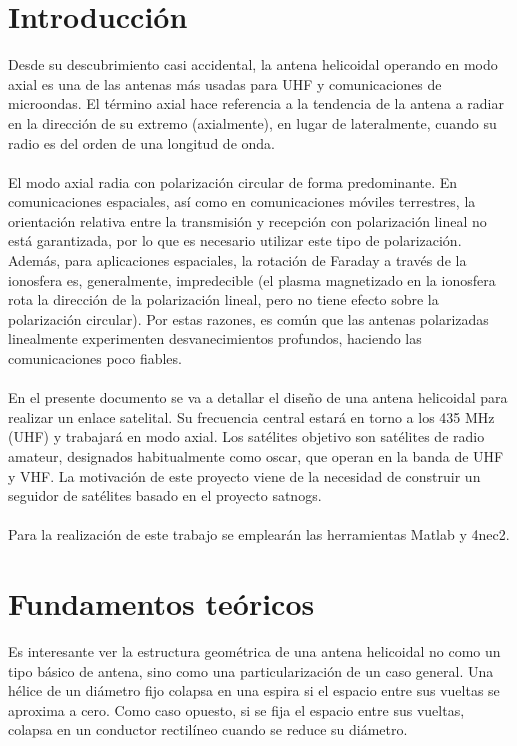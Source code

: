 \documentclass[12pt]{article}
\begin{document}
\tableofcontents
\pagebreak


\section{Introducción}
Desde su descubrimiento casi accidental, la antena helicoidal operando en modo axial es una de las antenas más usadas para UHF y comunicaciones de microondas. El término axial hace referencia a la tendencia de la antena a radiar en la dirección de su extremo (axialmente), en lugar de lateralmente, cuando su radio es del orden de una longitud de onda.\\\\
El modo axial radia con polarización circular de forma predominante. En comunicaciones espaciales, así como en comunicaciones móviles terrestres, la orientación relativa entre la transmisión y recepción con polarización lineal no está garantizada, por lo que es necesario utilizar este tipo de polarización. Además, para aplicaciones espaciales, la rotación de Faraday a través de la ionosfera es, generalmente, impredecible (el plasma magnetizado en la ionosfera rota la dirección de la polarización lineal, pero no tiene efecto sobre la polarización circular). Por estas razones, es común que las antenas polarizadas linealmente experimenten desvanecimientos profundos, haciendo las comunicaciones poco fiables.\\\\
En el presente documento se va a detallar el diseño de una antena helicoidal para realizar un enlace satelital. Su frecuencia central estará en torno a los 435 MHz (UHF) y trabajará en modo axial. Los satélites objetivo son satélites de radio amateur, designados habitualmente como \gls{oscar}, que operan en la banda de UHF y VHF. La motivación de este proyecto viene de la necesidad de construir un seguidor de satélites basado en el proyecto \gls{satnogs}.\\\\
Para la realización de este trabajo se emplearán las herramientas Matlab y 4nec2.

\newpage
\section{Fundamentos teóricos}
Es interesante ver la estructura geométrica de una antena helicoidal no como un tipo básico de antena, sino como una particularización de un caso general. Una hélice de un diámetro fijo colapsa en una espira si el espacio entre sus vueltas se aproxima a cero. Como caso opuesto, si se fija el espacio entre sus vueltas, colapsa en un conductor rectilíneo cuando se reduce su diámetro.
\end{document}
